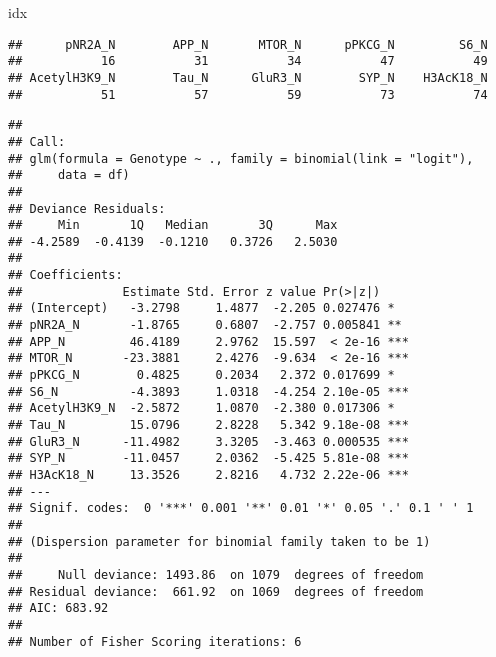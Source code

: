 \documentclass[]{article}
\newenvironment{Shaded}{\begin{snugshade}}{\end{snugshade}}
\newcommand{\KeywordTok}[1]{\textcolor[rgb]{0.13,0.29,0.53}{\textbf{#1}}}
\newcommand{\DataTypeTok}[1]{\textcolor[rgb]{0.13,0.29,0.53}{#1}}
\newcommand{\DecValTok}[1]{\textcolor[rgb]{0.00,0.00,0.81}{#1}}
\newcommand{\StringTok}[1]{\textcolor[rgb]{0.31,0.60,0.02}{#1}}
\newcommand{\OperatorTok}[1]{\textcolor[rgb]{0.81,0.36,0.00}{\textbf{#1}}}
\newcommand{\NormalTok}[1]{#1}
\begin{document}
\begin{Shaded}
\begin{Highlighting}[]
\NormalTok{idx}
\end{Highlighting}
\end{Shaded}

\begin{verbatim}
##      pNR2A_N        APP_N       MTOR_N      pPKCG_N         S6_N 
##           16           31           34           47           49 
## AcetylH3K9_N        Tau_N      GluR3_N        SYP_N    H3AcK18_N 
##           51           57           59           73           74
\end{verbatim}

\begin{Shaded}
\end{Shaded}

\begin{verbatim}
## 
## Call:
## glm(formula = Genotype ~ ., family = binomial(link = "logit"), 
##     data = df)
## 
## Deviance Residuals: 
##     Min       1Q   Median       3Q      Max  
## -4.2589  -0.4139  -0.1210   0.3726   2.5030  
## 
## Coefficients:
##              Estimate Std. Error z value Pr(>|z|)    
## (Intercept)   -3.2798     1.4877  -2.205 0.027476 *  
## pNR2A_N       -1.8765     0.6807  -2.757 0.005841 ** 
## APP_N         46.4189     2.9762  15.597  < 2e-16 ***
## MTOR_N       -23.3881     2.4276  -9.634  < 2e-16 ***
## pPKCG_N        0.4825     0.2034   2.372 0.017699 *  
## S6_N          -4.3893     1.0318  -4.254 2.10e-05 ***
## AcetylH3K9_N  -2.5872     1.0870  -2.380 0.017306 *  
## Tau_N         15.0796     2.8228   5.342 9.18e-08 ***
## GluR3_N      -11.4982     3.3205  -3.463 0.000535 ***
## SYP_N        -11.0457     2.0362  -5.425 5.81e-08 ***
## H3AcK18_N     13.3526     2.8216   4.732 2.22e-06 ***
## ---
## Signif. codes:  0 '***' 0.001 '**' 0.01 '*' 0.05 '.' 0.1 ' ' 1
## 
## (Dispersion parameter for binomial family taken to be 1)
## 
##     Null deviance: 1493.86  on 1079  degrees of freedom
## Residual deviance:  661.92  on 1069  degrees of freedom
## AIC: 683.92
## 
## Number of Fisher Scoring iterations: 6
\end{verbatim}
\end{document}

